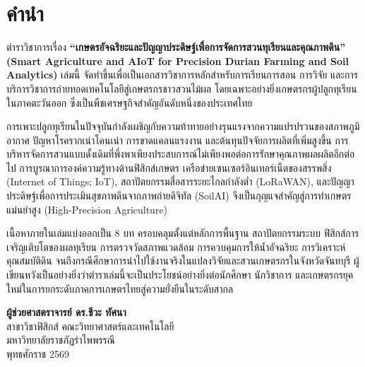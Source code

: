 \chapter*{คำนำ}

ตำราวิชาการเรื่อง \textbf{“เกษตรอัจฉริยะและปัญญาประดิษฐ์เพื่อการจัดการสวนทุเรียนและคุณภาพดิน” (Smart Agriculture and AIoT for Precision Durian Farming and Soil Analytics)} เล่มนี้ จัดทำขึ้นเพื่อเป็นเอกสารวิชาการหลักสำหรับการเรียนการสอน การวิจัย และการบริการวิชาการถ่ายทอดเทคโนโลยีสู่เกษตรกรชาวสวนไม้ผล โดยเฉพาะอย่างยิ่งเกษตรกรผู้ปลูกทุเรียนในภาคตะวันออก ซึ่งเป็นพืชเศรษฐกิจสำคัญอันดับหนึ่งของประเทศไทย

การเพาะปลูกทุเรียนในปัจจุบันกำลังเผชิญกับความท้าทายอย่างรุนแรงจากความแปรปรวนของสภาพภูมิอากาศ ปัญหาโรครากเน่าโคนเน่า การขาดแคลนแรงงาน และต้นทุนปัจจัยการผลิตที่เพิ่มสูงขึ้น การบริหารจัดการสวนแบบดั้งเดิมที่พึ่งพาเพียงประสบการณ์ไม่เพียงพอต่อการรักษาคุณภาพผลผลิตอีกต่อไป การบูรณาการองค์ความรู้ทางด้านฟิสิกส์เกษตร เครือข่ายเซนเซอร์อินเทอร์เน็ตของสรรพสิ่ง (Internet of Things; IoT), สถาปัตยกรรมสื่อสารระยะไกลกำลังต่ำ (LoRaWAN), และปัญญาประดิษฐ์เพื่อการประเมินสุขภาพดินจากภาพถ่ายดิจิทัล (SoilAI) จึงเป็นกุญแจสำคัญสู่การทำเกษตรแม่นยำสูง (High-Precision Agriculture)

เนื้อหาภายในเล่มแบ่งออกเป็น 8 บท ครอบคลุมตั้งแต่หลักการพื้นฐาน สถาปัตยกรรมระบบ ฟิสิกส์การเจริญเติบโตของผลทุเรียน การตรวจวัดสภาพแวดล้อม การควบคุมการให้น้ำอัจฉริยะ การวิเคราะห์คุณสมบัติดิน จนถึงกรณีศึกษาการนำไปใช้งานจริงในแปลงวิจัยและสวนเกษตรกรในจังหวัดจันทบุรี ผู้เขียนหวังเป็นอย่างยิ่งว่าตำราเล่มนี้จะเป็นประโยชน์อย่างยิ่งต่อนักศึกษา นักวิชาการ และเกษตรกรยุคใหม่ในการยกระดับภาคการเกษตรไทยสู่ความยั่งยืนในระดับสากล

\vspace{1.5cm}
\begin{flushright}
    \textbf{ผู้ช่วยศาสตราจารย์ ดร.ชีวะ ทัศนา}\\[0.2cm]
    สาขาวิชาฟิสิกส์ คณะวิทยาศาสตร์และเทคโนโลยี\\[0.1cm]
    มหาวิทยาลัยราชภัฏรำไพพรรณี\\[0.1cm]
    พุทธศักราช 2569
\end{flushright}
